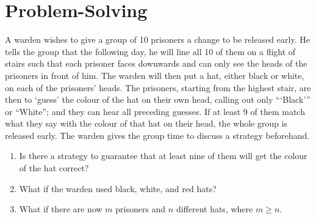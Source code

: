 \section{Problem-Solving}

\begin{problem}
    A warden wishes to give a group of 10 prisoners a change to be released early. He tells the group that the following day, he will line all 10 of them on a flight of stairs such that each prisoner faces downwards and can only see the heads of the prisoners in front of him. The warden will then put a hat, either black or white, on each of the prisoners' heads. The prisoners, starting from the highest stair, are then to `guess' the colour of the hat on their own head, calling out only ```Black''' or ``White''; and they can hear all preceding guesses. If at least 9 of them match what they say with the colour of that hat on their head, the whole group is released early. The warden gives the group time to discuss a strategy beforehand.

    \begin{enumerate}
        \item Is there a strategy to guarantee that at least nine of them will get the colour of the hat correct?
        \item What if the warden used black, white, and red hats?
        \item What if there are now $m$ prisoners and $n$ different hats, where $m \geq n$.
    \end{enumerate}
\end{problem}

